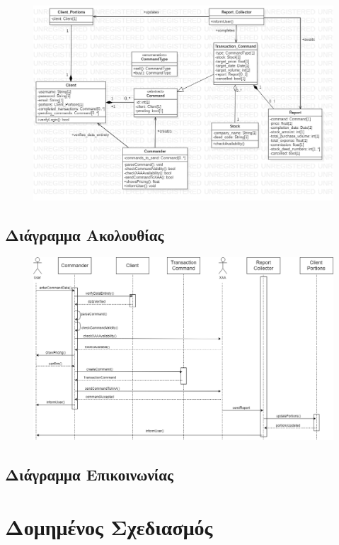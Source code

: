 \documentclass{article}
\begin{document}
\begin{figure}[!h]
	\includegraphics[width=\linewidth]{../UML/command_class_diagram.png}
\end{figure}

\subsection{Διάγραμμα Ακολουθίας}

\begin{figure}[!h]
	\includegraphics[width=15.5cm]{../UML/sequence_diagram.png}
\end{figure}

\newpage
\subsection{Διάγραμμα Επικοινωνίας}


\newpage
\section{Δομημένος Σχεδιασμός}
\end{document}

